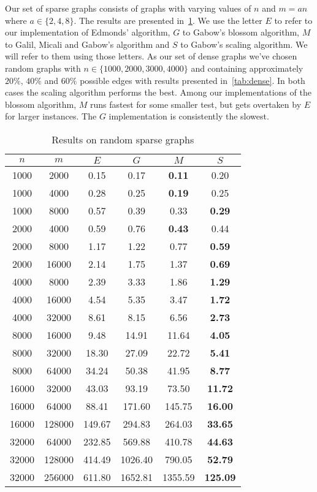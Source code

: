 Our set of sparse graphs consists of graphs with varying values of $n$ and $m = a n$ where $a \in \{2, 4, 8 \}$. The results are presented in~\ref{tab:sparse}. We use the letter $E$ to refer to our implementation of Edmonds' algorithm, $G$ to Gabow's blossom algorithm, $M$ to Galil, Micali and Gabow's algorithm and $S$ to Gabow's scaling algorithm. We will refer to them using those letters. 
As our set of dense graphs we've chosen random graphs with $n \in \{ 1000, 2000, 3000, 4000 \}$ and containing approximately $20\%$, $40\%$ and $60\%$ possible edges with results presented in~\ref{tab:dense}. In both cases the scaling algorithm performs the best. Among our implementations of the blossom algorithm, $M$ runs fastest for some smaller test, but gets overtaken by $E$ for larger instances. The $G$ implementation is consistently the slowest.

\begin{table}
\centering
\begin{tabular}{
cc|cccc}
$n$ & $m$ & $E$ & $G$ & $M$ & $S$ \\
\hline
1000 & 2000 & 0.15 & 0.17 & \textbf{0.11} & 0.20 \\
1000 & 4000 & 0.28 & 0.25 & \textbf{0.19} & 0.25 \\
1000 & 8000 & 0.57 & 0.39 & 0.33 & \textbf{0.29} \\
2000 & 4000 & 0.59 & 0.76 & \textbf{0.43} & 0.44 \\
2000 & 8000 & 1.17 & 1.22 & 0.77 & \textbf{0.59} \\
2000 & 16000 & 2.14 & 1.75 & 1.37 & \textbf{0.69} \\
4000 & 8000 & 2.39 & 3.33 & 1.86 & \textbf{1.29} \\
4000 & 16000 & 4.54 & 5.35 & 3.47 & \textbf{1.72} \\
4000 & 32000 & 8.61 & 8.15 & 6.56 & \textbf{2.73} \\
8000 & 16000 & 9.48 & 14.91 & 11.64 & \textbf{4.05} \\
8000 & 32000 & 18.30 & 27.09 & 22.72 & \textbf{5.41} \\
8000 & 64000 & 34.24 & 50.38 & 41.95 & \textbf{8.77} \\
16000 & 32000 & 43.03 & 93.19 & 73.50 & \textbf{11.72} \\
16000 & 64000 & 88.41 & 171.60 & 145.75 & \textbf{16.00} \\
16000 & 128000 & 149.67 & 294.83 & 264.03 & \textbf{33.65} \\
32000 & 64000 & 232.85 & 569.88 & 410.78 & \textbf{44.63} \\
32000 & 128000 & 414.49 & 1026.40 & 790.05 & \textbf{52.79} \\
32000 & 256000 & 611.80 & 1652.81 & 1355.59 & \textbf{125.09} \\
\end{tabular}
\caption{Results on random sparse graphs}\label{tab:sparse}
\end{table}


